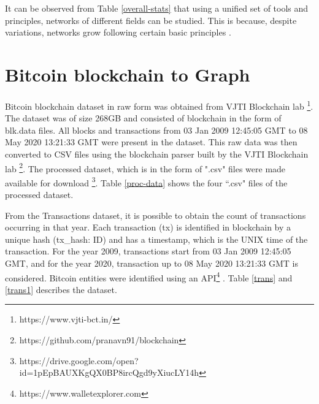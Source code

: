 \documentclass[preprint,12pt]{elsarticle}
\begin{document}
It can be observed from Table \ref{overall-stats} that using a unified set of tools and principles, networks of different fields can be studied. This is because, despite variations, networks grow following certain basic principles \cite{barabasi2013network}.

\section{Bitcoin blockchain to Graph} \label{block2graph}
Bitcoin blockchain dataset in raw form was obtained from VJTI Blockchain lab \footnote{https://www.vjti-bct.in/}. The dataset was of size 268GB and consisted of blockchain in the form of blk.data files. All blocks and transactions from 03 Jan 2009 12:45:05 GMT to 08 May 2020 13:21:33 GMT were present in the dataset. This raw data was then converted to CSV files using the blockchain parser built by the VJTI Blockchain lab \footnote{https://github.com/pranavn91/blockchain}. The processed dataset, which is in the form of ".csv" files were made available for download   \footnote{https://drive.google.com/open?id=1pEpBAUXKgQX0BP8ircQgd9yXiucLY14h}. Table \ref{proc-data} shows the four ``.csv" files of the processed dataset.  

\begin{table}[!h]
\centering
\caption{Description of processed dataset}
\label{proc-data}
\end{table}

From the Transactions dataset, it is possible to obtain the count of transactions occurring in that year. Each transaction (tx) is identified in blockchain by a unique hash (tx\_hash: ID) and has a timestamp, which is the UNIX time of the transaction. For the year 2009, transactions start from 03 Jan 2009 12:45:05 GMT, and for the year 2020, transaction up to 08 May 2020 13:21:33 GMT is considered. Bitcoin entities were identified using an API\footnote{https://www.walletexplorer.com} \cite{janda2016walletexplorer}. Table \ref{trans} and \ref{trans1} describes the dataset.  
\end{document}
